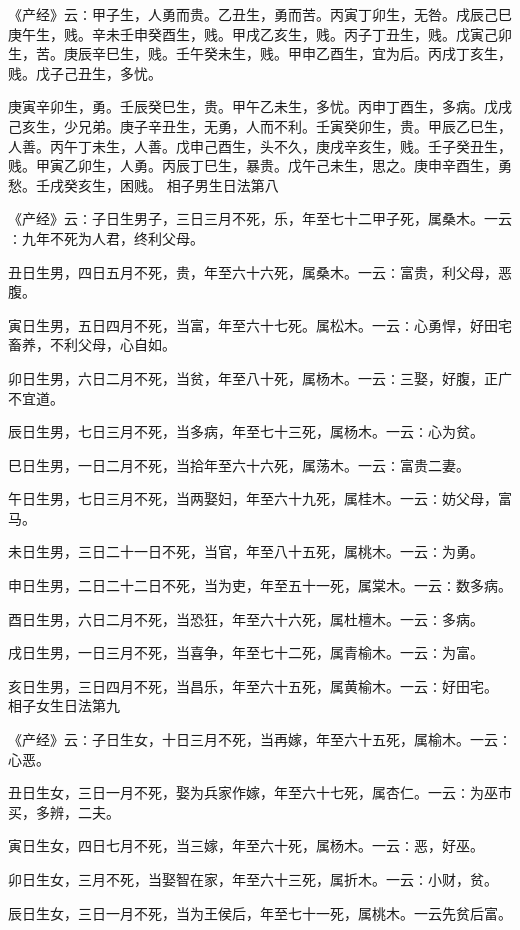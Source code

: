 \documentclass[a4paper,12pt,UTF8,twoside]{ctexbook}
\begin{document}
《产经》云∶甲子生，人勇而贵。乙丑生，勇而苦。丙寅丁卯生，无咎。戌辰己巳庚午生，贱。辛未壬申癸酉生，贱。甲戌乙亥生，贱。丙子丁丑生，贱。戊寅己卯生，苦。庚辰辛巳生，贱。壬午癸未生，贱。甲申乙酉生，宜为后。丙戌丁亥生，贱。戊子己丑生，多忧。

庚寅辛卯生，勇。壬辰癸巳生，贵。甲午乙未生，多忧。丙申丁酉生，多病。戊戌己亥生，少兄弟。庚子辛丑生，无勇，人而不利。壬寅癸卯生，贵。甲辰乙巳生，人善。丙午丁未生，人善。戊申己酉生，头不久，庚戌辛亥生，贱。壬子癸丑生，贱。甲寅乙卯生，人勇。丙辰丁巳生，暴贵。戊午己未生，思之。庚申辛酉生，勇愁。壬戌癸亥生，困贱。
相子男生日法第八

《产经》云∶子日生男子，三日三月不死，乐，年至七十二甲子死，属桑木。一云∶九年不死为人君，终利父母。

丑日生男，四日五月不死，贵，年至六十六死，属桑木。一云∶富贵，利父母，恶腹。

寅日生男，五日四月不死，当富，年至六十七死。属松木。一云∶心勇悍，好田宅畜养，不利父母，心自如。

卯日生男，六日二月不死，当贫，年至八十死，属杨木。一云∶三娶，好腹，正广不宜道。

辰日生男，七日三月不死，当多病，年至七十三死，属杨木。一云∶心为贫。

巳日生男，一日二月不死，当拾年至六十六死，属荡木。一云∶富贵二妻。

午日生男，七日三月不死，当两娶妇，年至六十九死，属桂木。一云∶妨父母，富马。

未日生男，三日二十一日不死，当官，年至八十五死，属桃木。一云∶为勇。

申日生男，二日二十二日不死，当为吏，年至五十一死，属棠木。一云∶数多病。

酉日生男，六日二月不死，当恐狂，年至六十六死，属杜檀木。一云∶多病。

戌日生男，一日三月不死，当喜争，年至七十二死，属青榆木。一云∶为富。

亥日生男，三日四月不死，当昌乐，年至六十五死，属黄榆木。一云∶好田宅。
相子女生日法第九

《产经》云∶子日生女，十日三月不死，当再嫁，年至六十五死，属榆木。一云∶心恶。

丑日生女，三日一月不死，娶为兵家作嫁，年至六十七死，属杏仁。一云∶为巫市买，多辨，二夫。

寅日生女，四日七月不死，当三嫁，年至六十死，属杨木。一云∶恶，好巫。

卯日生女，三月不死，当娶智在家，年至六十三死，属折木。一云∶小财，贫。

辰日生女，三日一月不死，当为王侯后，年至七十一死，属桃木。一云先贫后富。
\end{document}
